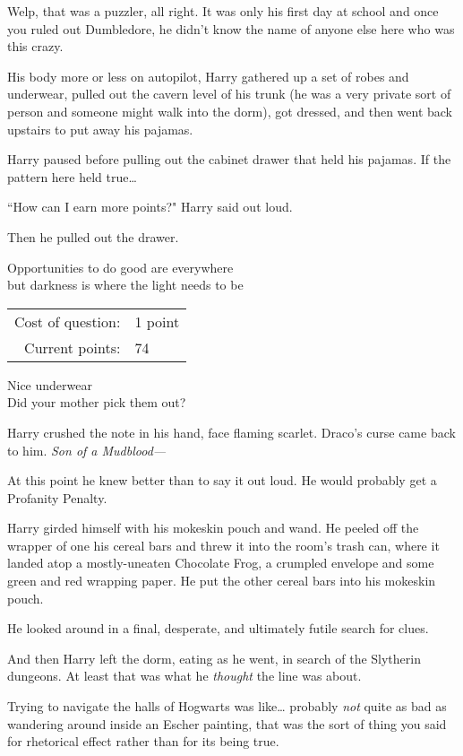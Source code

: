 Welp, that was a puzzler, all right. It was only his first day at school and once you ruled out Dumbledore, he didn't know the name of anyone else here who was this crazy.

His body more or less on autopilot, Harry gathered up a set of robes and underwear, pulled out the cavern level of his trunk (he was a very private sort of person and someone might walk into the dorm), got dressed, and then went back upstairs to put away his pajamas.

Harry paused before pulling out the cabinet drawer that held his pajamas. If the pattern here held true{\ldots}

``How can I earn more points?" Harry said out loud.

Then he pulled out the drawer.
\begin{writtenNote}
Opportunities to do good are everywhere\\
but darkness is where the light needs to be

\begin{tabular}{rl}
Cost of question: & 1 point\\
Current points: & 74
\end{tabular}

Nice underwear\\
Did your mother pick them out?
\end{writtenNote}

Harry crushed the note in his hand, face flaming scarlet. Draco's curse came back to him. \emph{Son of a Mudblood—}

At this point he knew better than to say it out loud. He would probably get a Profanity Penalty.

Harry girded himself with his mokeskin pouch and wand. He peeled off the wrapper of one his cereal bars and threw it into the room's trash can, where it landed atop a mostly-uneaten Chocolate Frog, a crumpled envelope and some green and red wrapping paper. He put the other cereal bars into his mokeskin pouch.

He looked around in a final, desperate, and ultimately futile search for clues.

And then Harry left the dorm, eating as he went, in search of the Slytherin dungeons. At least that was what he \emph{thought} the line was about.

Trying to navigate the halls of Hogwarts was like{\ldots} probably \emph{not} quite as bad as wandering around inside an Escher painting, that was the sort of thing you said for rhetorical effect rather than for its being true.

